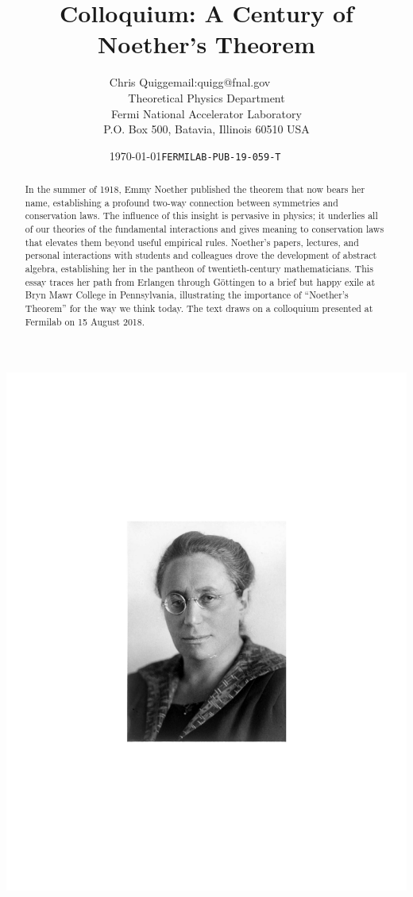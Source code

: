 \documentclass[twoside,symmetric]{tufte-handout}
\title{Colloquium: A Century of Noether's Theorem}%
\author[Chris Quigg]{Chris Quigg\hfill{\small email:quigg@fnal.gov~~~~~~}\\
{\normalsize Theoretical Physics Department\\ Fermi National Accelerator
Laboratory\\ P.O. Box 500, Batavia, Illinois 60510 USA}}
\date{{\today}\hfill {\texttt{\hbox{\small FERMILAB-PUB-19-059-T~~~~}}}} %
\begin{document}
\maketitle%
\begin{marginfigure}[112pt]
\centering
\includegraphics[width=0.75\columnwidth]{EmmyFigs/Emmy_NoetherBMarchiveC2algray}
\end{marginfigure}
\begin{abstract}
\noindent
In the summer of 1918, Emmy Noether published the theorem that now bears her name, establishing a profound two-way connection between symmetries and conservation laws. The influence of this insight is pervasive in physics; it underlies all of our theories of the fundamental interactions and gives meaning to conservation laws that elevates them beyond useful empirical rules. Noether's papers, lectures, and personal interactions with students and colleagues drove the development of abstract algebra, establishing her in the pantheon of twentieth-century mathematicians. This essay traces her path from Erlangen through G\"ottingen to a brief but happy exile at Bryn Mawr College in Pennsylvania, illustrating the importance of ``Noether's Theorem'' for the way we think today. The text draws on a colloquium presented at Fermilab on 15 August 2018.
\end{abstract}
\end{document}
